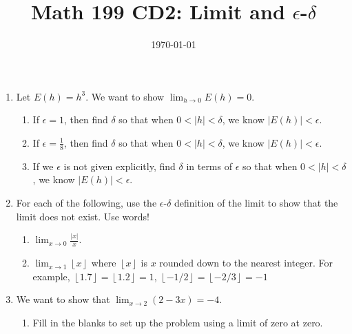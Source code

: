 \documentclass{article}
\title{Math 199 CD2: Limit and $\epsilon$-$\delta$}
\date{\today}
\newcommand{\D}{\displaystyle}
\newcommand{\floor}[1]{\left\lfloor#1\right\rfloor}
\begin{document}
\maketitle



\begin{enumerate}
	
	\item Let $E(h)=h^3$. We want to show $\D \lim_{h \to 0} E(h)=0$.
	\begin{enumerate}
		\item If $\epsilon=1$, then find $\delta$ so that when $0 < |h| < \delta$, we know $|E(h)| < \epsilon$.
		\vspace{1in}
		\item If $\epsilon=\frac{1}{8}$, then find $\delta$ so that when $0 < |h| < \delta$, we know $|E(h)| < \epsilon$.
		\vspace{1in}
		\item If we $\epsilon$ is not given explicitly, find $\delta$ in terms of $\epsilon$ so that when $0 < |h| < \delta$, we know $|E(h)| < \epsilon$. 
		\vspace{1in}
	\end{enumerate}

\item For each of the following, use the $\epsilon$-$\delta$ definition of the limit to show that the limit does not exist. Use words!

\begin{enumerate}

\item $\D \lim_{x\to 0} \frac{|x|}{x}$.

\vspace{4cm}

\newpage
\item $\D \lim_{x\to 1} \floor{x}$ where $\floor{x}$ is $x$ rounded down to the nearest integer. For example, $\floor{1.7}=\floor{1.2}=1$, $\floor{-1/2}=\floor{-2/3}=-1$

\vspace{4cm}



\vspace{4cm}

\end{enumerate}

\item We want to show that $\D \lim_{x \to 2} (2-3x) = -4$.
\begin{enumerate}
	\item Fill in the blanks to set up the problem using a limit of zero at zero. 
	

\end{enumerate}
\end{enumerate}
\end{document}
